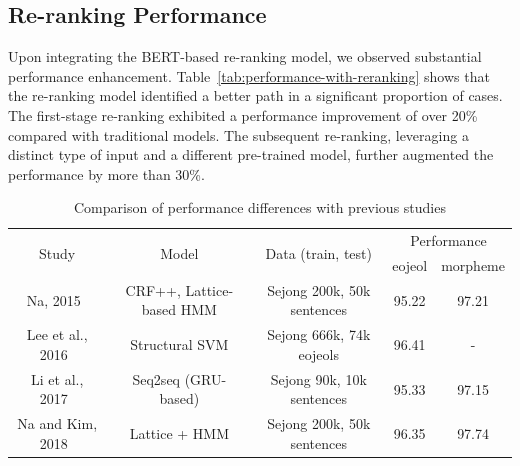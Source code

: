\documentclass[AMS,STIX2COL]{WileyNJD-v2}
\begin{document}
    \subsection{Re-ranking Performance}\label{subsec:reranking-performance}

    Upon integrating the BERT-based re-ranking model, we observed substantial performance enhancement.
    Table~\ref{tab:performance-with-reranking} shows that the re-ranking model identified a better path in a significant proportion of cases.
    The first-stage re-ranking exhibited a performance improvement of over 20\% compared with traditional models.
    The subsequent re-ranking, leveraging a distinct type of input and a different pre-trained model, further augmented the performance by more than 30\%.

    \begin{table}[]
        \caption{Comparison of performance differences with previous studies}
        \label{tab:differences-with-previous-studies}
        \begin{tabular*}{500pt}{@{\extracolsep\fill}ccc|cc@{\extracolsep\fill}}
            \toprule
            \multirow{2}{*}{Study}                & \multirow{2}{*}{Model}                          & \multirow{2}{*}{Data (train, test)}         & \multicolumn{2}{c}{Performance}                           \\
            \cmidrule{4-5}
            ~                                     & ~                                               & ~                                           & \multicolumn{1}{c}{eojeol} & \multicolumn{1}{c}{morpheme} \\
            \midrule
            Na, 2015~\cite{NaSH2015}              & CRF++, Lattice-based HMM                        & Sejong 200k, 50k sentences                  & 95.22                      & 97.21                        \\
            Lee et al., 2016~\cite{LeeCH2016}     & Structural SVM                                  & Sejong 666k, 74k eojeols                    & 96.41                      & -                            \\
            Li et al., 2017~\cite{Li2017}         & Seq2seq (GRU-based)                             & Sejong 90k, 10k sentences                   & 95.33                      & 97.15                        \\
            Na and Kim, 2018~\cite{NaSH2018}      & Lattice + HMM                                   & Sejong 200k, 50k sentences                  & 96.35                      & 97.74                        \\

\end{tabular*}
\end{table}
\end{document}
